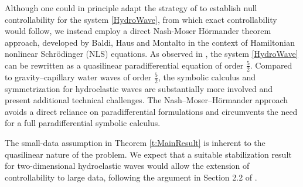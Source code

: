 \documentclass[12pt]{amsart}
\theoremstyle{remark}
\theoremstyle{definition}
\numberwithin{equation}{section}
\newcommand{\f}{\frac}
\begin{document}
Although one could in principle adapt the strategy of \cite{MR3776276} to establish null controllability for the system \eqref{HydroWave}, from which exact controllability would follow, we instead employ a direct Nash-Moser H\"ormander theorem approach, developed by Baldi, Haus and Montalto \cite{BHM} in the context of Hamiltonian nonlinear Schr\"odinger (NLS) equations.
As observed in \cite{WanY}, the system \eqref{HydroWave} can be rewritten as a quasilinear paradifferential equation of order $\frac{5}{2}$.
Compared to gravity–capillary water waves  of order $\f52$, the symbolic calculus and symmetrization for hydroelastic waves are substantially more involved and present additional technical challenges.
The Nash–Moser–H\"ormander approach avoids a direct reliance on paradifferential formulations and circumvents the need for a full paradifferential symbolic calculus.

The small-data assumption in Theorem  \ref{t:MainResult} is inherent to the quasilinear nature of the problem.
We expect that a suitable stabilization result for two-dimensional hydroelastic waves would allow the extension of controllability to large data, following the argument in Section 2.2 of \cite{MR3708590}.
\end{document}
